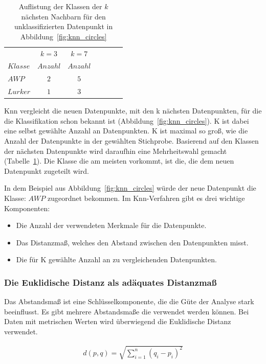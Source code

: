\documentclass[envcountsame, envcountchap, deutsch]{i-studis}
\begin{document}
\begin{table}
    \centering
    \begin{tabular}{lcccccl}
        \toprule 
        & \multicolumn{1}{c}{$k=3$} & \multicolumn{1}{c}{$k=7$}
        \\\cmidrule(lr){2-2}\cmidrule(lr){3-3}
        $Klasse$ & $Anzahl$ & $Anzahl$ \\
        $AWP$    &   $2$     & $5$       \\
        $Lurker$ &   $1$     & $3$       \\\bottomrule
    \end{tabular}
    \caption{Auflistung der Klassen der $k$ nächsten Nachbarn für den unklassifizierten Datenpunkt in Abbildung~\ref{fig:knn_circles}}\label{tab:majority_rule}
\end{table}
Knn vergleicht die neuen Datenpunkte, mit den k nächsten Datenpunkten, für die die Klassifikation schon bekannt ist (Abbildung~\ref{fig:knn_circles}).
K ist dabei eine selbst gewählte Anzahl an Datenpunkten. K ist maximal so groß, wie die Anzahl der Datenpunkte in der gewählten Stichprobe. 
Basierend auf den Klassen der nächsten Datenpunkte wird daraufhin eine Mehrheitswahl gemacht (Tabelle~\ref{tab:majority_rule}).
Die Klasse die am meisten vorkommt, ist die, die dem neuen Datenpunkt zugeteilt wird. 

In dem Beispiel aus Abbildung~\ref{fig:knn_circles} würde der neue Datenpunkt die Klasse: $AWP$ zugeordnet bekommen. Im Knn-Verfahren gibt es drei wichtige Komponenten:

\begin{itemize}
    \item Die Anzahl der verwendeten Merkmale für die Datenpunkte.
    \item Das Distanzmaß, welches den Abstand zwischen den Datenpunkten misst.
    \item Die für K gewählte Anzahl an zu vergleichenden Datenpunkten. 
\end{itemize}

\subsubsection{Die Euklidische Distanz als adäquates Distanzmaß}
Das Abstandsmaß ist eine Schlüsselkomponente, die die Güte der Analyse stark beeinflusst. Es gibt mehrere Abstandsmaße die verwendet werden können. 
Bei Daten mit metrischen Werten wird überwiegend die Euklidische Distanz verwendet.

\begin{align}
    d\left( p,q\right)   = \sqrt {\sum _{i=1}^{n}  {\left( q_{i}-p_{i}\right)}^2 }\label{eq:euklidische_distanz}
\end{align}
\end{document}
